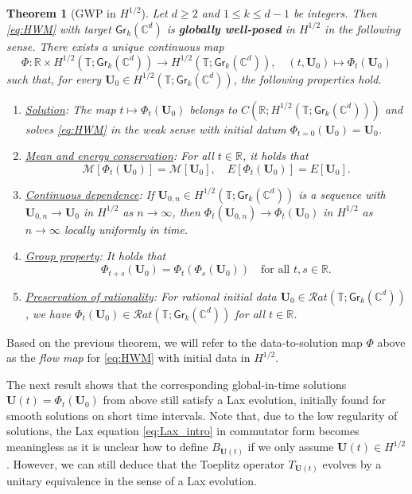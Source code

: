 \documentclass[10pt,reqno,a4paper]{amsart}
\newtheorem{thm}{Theorem}[section]
\theoremstyle{definition}
\theoremstyle{remark}
\theoremstyle{remark}
\numberwithin{equation}{section}
\newcommand{\C}{\mathbb{C}}
\newcommand{\R}{\mathbb{R}}
\newcommand{\T}{\mathbb{T}}
\newcommand{\Mean}{\mathscr{M}}
\newcommand{\Ub}{\mathbf{U}}
\newcommand{\Gr}{\mathsf{Gr}}
\begin{document}
\begin{thm}[GWP in $H^{1/2}$] \label{thm:gwp}
Let $d \geq 2$ and $1 \leq k \leq d-1$ be integers. Then  \eqref{eq:HWM} with target $\Gr_k(\C^d)$ is \textbf{globally well-posed} in $H^{1/2}$ in the following sense. There exists a unique continuous map 
 $$
\Phi : \R \times H^{1/2}(\T; \Gr_k(\C^d)) \to H^{1/2}(\T; \Gr_k(\C^d)), \quad (t,\Ub_0) \mapsto \Phi_t(\Ub_0)
 $$ 
 such that, for every  $\Ub_0 \in H^{1/2}(\T; \Gr_k(\C^d))$, the following properties hold.
\begin{enumerate}
\item[(i)] \underline{Solution}: The map $t \mapsto \Phi_t(\Ub_0)$ belongs to $C(\R; H^{1/2}(\T; \Gr_k(\C^d)))$ and solves \eqref{eq:HWM} in the weak sense with initial datum $\Phi_{t=0}(\Ub_0)= \Ub_0$.
\item[(ii)] \underline{Mean and energy conservation}: For all $t \in \R$, it holds that
$$
\Mean[\Phi_t(\Ub_0)] = \Mean[\Ub_0] , \quad E[\Phi_t(\Ub_0)] = E[\Ub_0].
$$
\item[(iii)] \underline{Continuous dependence}: If $\Ub_{0,n} \in H^{1/2}(\T; \Gr_k(\C^d))$ is a sequence with $\Ub_{0,n} \to \Ub_0$ in $H^{1/2}$ as $n \to \infty$, then $\Phi_t(\Ub_{0,n}) \to \Phi_t(\Ub_0)$ in $H^{1/2}$ as $n \to \infty$ locally uniformly in time. 
\item[(iv)] \underline{Group property}: It holds that
$$
\Phi_{t+s}(\Ub_0) = \Phi_t(\Phi_s(\Ub_0)) \quad \mbox{for all $t,s \in \R$}.
$$
\item[(v)] \underline{Preservation of rationality}: For rational initial data $\Ub_0 \in \mathcal{R}at(\T; \Gr_k(\C^d))$, we have $\Phi_t(\Ub_0) \in \mathcal{R}at(\T; \Gr_k(\C^d))$ for all $t \in \R$.
\end{enumerate}
\end{thm}

Based on the previous theorem, we will refer to the data-to-solution map $\Phi$ above as the {\em flow map} for \eqref{eq:HWM} with initial data in $H^{1/2}$. 

The next result shows that the corresponding global-in-time solutions $\Ub(t) = \Phi_t(\Ub_0)$ from above still satisfy a Lax evolution, initially found for smooth solutions on short time intervals. Note that, due to the low regularity of solutions, the Lax equation \eqref{eq:Lax_intro} in commutator form becomes meaningless as it is unclear how to define $B_{\Ub(t)}$ if we only assume $\Ub(t) \in H^{1/2}$. However, we can still deduce that the Toeplitz operator $T_{\Ub(t)}$ evolves by a unitary equivalence in the sense of a Lax evolution. 
\end{document}
